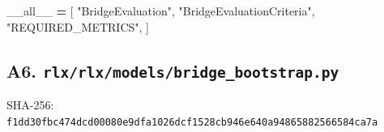 \documentclass[
  american,
  11pt,
  letterpaper,
]{article}
\newenvironment{Shaded}{\begin{snugshade}}{\end{snugshade}}
\newcommand{\NormalTok}[1]{#1}
\newcommand{\OperatorTok}[1]{\textcolor[rgb]{0.81,0.36,0.00}{\textbf{#1}}}
\newcommand{\StringTok}[1]{\textcolor[rgb]{0.31,0.60,0.02}{#1}}
\newcommand{\VariableTok}[1]{\textcolor[rgb]{0.00,0.00,0.00}{#1}}
\renewenvironment{Shaded}{\par\smallskip}{\par\smallskip}
\begin{document}
\begin{Shaded}
\begin{Highlighting}[]
\VariableTok{\_\_all\_\_} \OperatorTok{=}\NormalTok{ [}
    \StringTok{"BridgeEvaluation"}\NormalTok{,}
    \StringTok{"BridgeEvaluationCriteria"}\NormalTok{,}
    \StringTok{"REQUIRED\_METRICS"}\NormalTok{,}
\NormalTok{]}
\end{Highlighting}
\end{Shaded}

\subsection{\texorpdfstring{A6.
\texttt{rlx/\allowbreak{}rlx/\allowbreak{}models/\allowbreak{}bridge\_\allowbreak{}bootstra\allowbreak{}p.py}}{A6. }}\label{a6.-rlxrlxmodelsbridge_bootstrap.py}

SHA-256:
\texttt{f1dd30fb\allowbreak{}c474dcd0\allowbreak{}0080e9df\allowbreak{}a1026dcf\allowbreak{}1528cb94\allowbreak{}6e640a94\allowbreak{}86588256\allowbreak{}6584ca7a\allowbreak{}}
\end{document}
